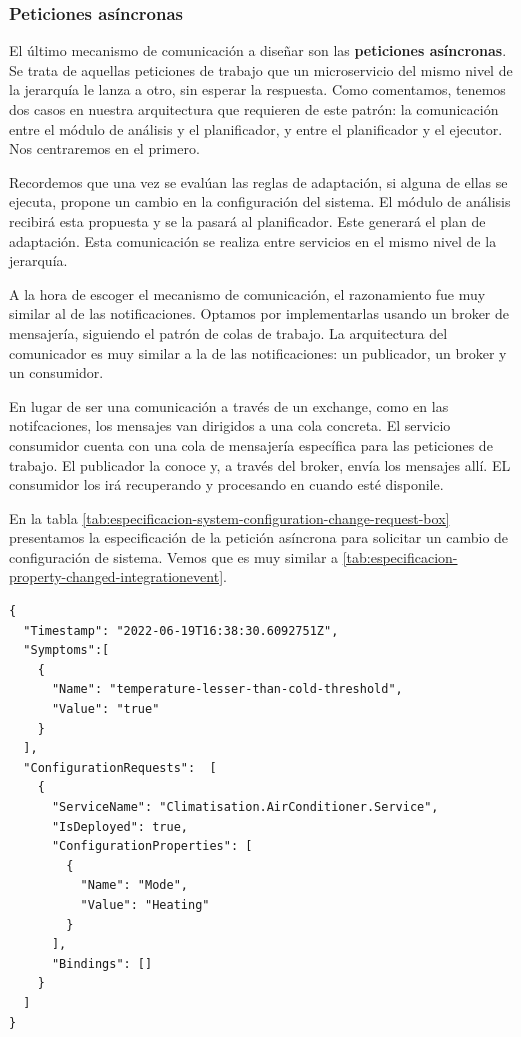 \subsubsection{Peticiones asíncronas}

El último mecanismo de comunicación a diseñar son las \textbf{peticiones asíncronas}. Se trata de aquellas peticiones de trabajo que un microservicio del mismo nivel de la jerarquía le lanza a otro, sin esperar la respuesta. Como comentamos, tenemos dos casos en nuestra arquitectura que requieren de este patrón: la comunicación entre el módulo de análisis y el planificador, y entre el planificador y el ejecutor. Nos centraremos en el primero.

Recordemos que una vez se evalúan las reglas de adaptación, si alguna de ellas se ejecuta, propone un cambio en la configuración del sistema. El módulo de análisis recibirá esta propuesta y se la pasará al planificador. Este generará el plan de adaptación. Esta comunicación se realiza entre servicios en el mismo nivel de la jerarquía.

A la hora de escoger el mecanismo de comunicación, el razonamiento fue muy similar al de las notificaciones. Optamos por implementarlas usando un broker de mensajería, siguiendo el patrón de colas de trabajo. La arquitectura del comunicador es muy similar a la de las notificaciones: un publicador, un broker y un consumidor.

En lugar de ser una comunicación  a través de un exchange, como en las notifcaciones, los mensajes van dirigidos a una cola concreta. El servicio consumidor cuenta con una cola de mensajería específica para las peticiones de trabajo. El publicador la conoce y, a través del broker, envía los mensajes allí. EL consumidor los irá recuperando y procesando en cuando esté disponile.

En la tabla \ref{tab:especificacion-system-configuration-change-request-box} presentamos la especificación de la petición asíncrona para solicitar un cambio de configuración de sistema. Vemos que es muy similar a \ref{tab:especificacion-property-changed-integrationevent}.

\newsavebox\systemconfigurationchangerequestbox
\begin{lrbox}{\systemconfigurationchangerequestbox}
  \begin{minipage}[t]{2in}
    \begin{verbatim}
{
  "Timestamp": "2022-06-19T16:38:30.6092751Z",
  "Symptoms":[
    {
      "Name": "temperature-lesser-than-cold-threshold",
      "Value": "true"
    }
  ],
  "ConfigurationRequests":  [
    {
      "ServiceName": "Climatisation.AirConditioner.Service",
      "IsDeployed": true,
      "ConfigurationProperties": [
        {
          "Name": "Mode",
          "Value": "Heating"
        }
      ],
      "Bindings": []
    }
  ]
}
        \end{verbatim}
  \end{minipage}
\end{lrbox}

